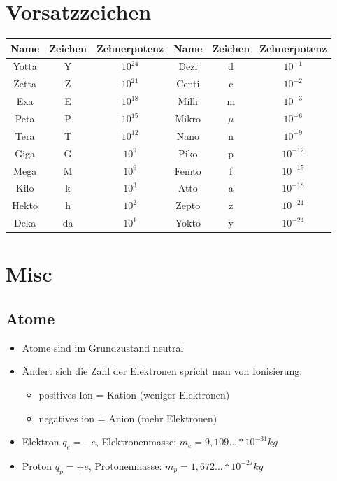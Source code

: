 \documentclass[12pt,a4paper]{report}%
\numberwithin{equation}{section}
\numberwithin{equation}{subsection}
\begin{document}
	\section{Vorsatzzeichen}
	\begin{table}[H]
	  \centering
		\begin{tabular} {|c|c|c|c|c|c|} \hline
			Name & Zeichen & Zehnerpotenz & Name & Zeichen & Zehnerpotenz \\ \hline
			Yotta & Y & $10^{24}$ & Dezi & d & $10^{-1}$ \\ \hline
			Zetta & Z & $10^{21}$ & Centi & c & $10^{-2}$ \\ \hline
			Exa & E & $10^{18}$ & Milli & m & $10^{-3}$ \\ \hline
			Peta & P & $10^{15}$ & Mikro & $\mu$ & $10^{-6}$ \\ \hline
			Tera & T & $10^{12}$ & Nano & n & $10^{-9}$ \\ \hline
			Giga & G & $10^{9}$ & Piko & p & $10^{-12}$ \\ \hline
			Mega & M & $10^{6}$ & Femto & f & $10^{-15}$ \\ \hline
			Kilo & k & $10^{3}$ & Atto & a & $10^{-18}$ \\ \hline
			Hekto & h & $10^{2}$ & Zepto & z & $10^{-21}$ \\ \hline
			Deka & da & $10^{1}$ & Yokto & y & $10^{-24}$ \\ \hline
		\end{tabular}
	\end{table}
 \newpage
	\section{Misc}
		\subsection{Atome}
		\begin{itemize}
			\item Atome sind im Grundzustand neutral
			\item Ändert sich die Zahl der Elektronen spricht man von Ionisierung:
		\begin{itemize}
			\item positives Ion = Kation (weniger Elektronen)
			\item negatives ion = Anion (mehr Elektronen)
		\end{itemize}
			\item Elektron $q_e = -e$, Elektronenmasse: $m_e = 9,109... * 10^{-31}kg$ 
			\item Proton $q_p = +e$, Protonenmasse: $m_p = 1,672... * 10^{-27}kg$
		\end{itemize}
\end{document}
